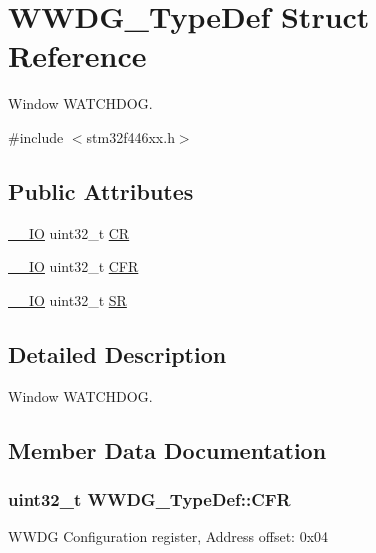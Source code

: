 \hypertarget{struct_w_w_d_g___type_def}{}\section{W\+W\+D\+G\+\_\+\+Type\+Def Struct Reference}
\label{struct_w_w_d_g___type_def}


Window W\+A\+T\+C\+H\+D\+OG.  




{\ttfamily \#include $<$stm32f446xx.\+h$>$}

\subsection*{Public Attributes}
\begin{DoxyCompactItemize}
\item 
\hyperlink{core__sc300_8h_aec43007d9998a0a0e01faede4133d6be}{\+\_\+\+\_\+\+IO} uint32\+\_\+t \hyperlink{struct_w_w_d_g___type_def_a4caf530d45f7428c9700d9c0057135f8}{CR}
\item 
\hyperlink{core__sc300_8h_aec43007d9998a0a0e01faede4133d6be}{\+\_\+\+\_\+\+IO} uint32\+\_\+t \hyperlink{struct_w_w_d_g___type_def_adcd6a7e5d75022e46ce60291f4b8544c}{C\+FR}
\item 
\hyperlink{core__sc300_8h_aec43007d9998a0a0e01faede4133d6be}{\+\_\+\+\_\+\+IO} uint32\+\_\+t \hyperlink{struct_w_w_d_g___type_def_a15655cda4854cc794db1f27b3c0bba38}{SR}
\end{DoxyCompactItemize}


\subsection{Detailed Description}
Window W\+A\+T\+C\+H\+D\+OG. 

\subsection{Member Data Documentation}
\subsubsection[{\texorpdfstring{C\+FR}{CFR}}]{ uint32\+\_\+t W\+W\+D\+G\+\_\+\+Type\+Def\+::\+C\+FR}\hypertarget{struct_w_w_d_g___type_def_adcd6a7e5d75022e46ce60291f4b8544c}{}\label{struct_w_w_d_g___type_def_adcd6a7e5d75022e46ce60291f4b8544c}
W\+W\+DG Configuration register, Address offset\+: 0x04 
